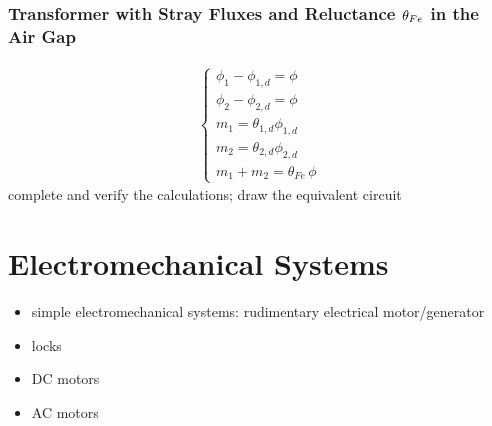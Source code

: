 \documentclass[letterpaper,10pt,english]{jupyterBook}
\begin{document}
\subsection{Transformer with Stray Fluxes and Reluctance \protect\(\theta_{Fe}\protect\) in the Air Gap}
\label{\detokenize{ch/circuits-electromagnetic-transformer:transformer-with-stray-fluxes-and-reluctance-theta-fe-in-the-air-gap}}\begin{equation*}
\begin{split}\begin{cases}
  \phi_{1} - \phi_{1,d} = \phi \\
  \phi_{2} - \phi_{2,d} = \phi \\
  m_{1} = \theta_{1,d} \phi_{1,d} \\
  m_{2} = \theta_{2,d} \phi_{2,d} \\
  m_1 + m_2 = \theta_{Fe} \, \phi
\end{cases}\end{split}
\end{equation*}
\sphinxAtStartPar
{} complete and verify the calculations; draw the equivalent circuit

\sphinxstepscope




\chapter{Electromechanical Systems}
\label{\detokenize{ch/systems-electromechanic:electromechanical-systems}}\label{\detokenize{ch/systems-electromechanic:classical-electromagnetism-systems-electromechanic}}\label{\detokenize{ch/systems-electromechanic::doc}}
\sphinxAtStartPar
{}

\sphinxAtStartPar
{}
\begin{itemize}
\item {} 
\sphinxAtStartPar
simple electromechanical systems: rudimentary electrical motor/generator

\item {} 
\sphinxAtStartPar
locks

\item {} 
\sphinxAtStartPar
DC motors

\item {} 
\sphinxAtStartPar
AC motors

\end{itemize}



\sphinxstepscope
\end{document}
